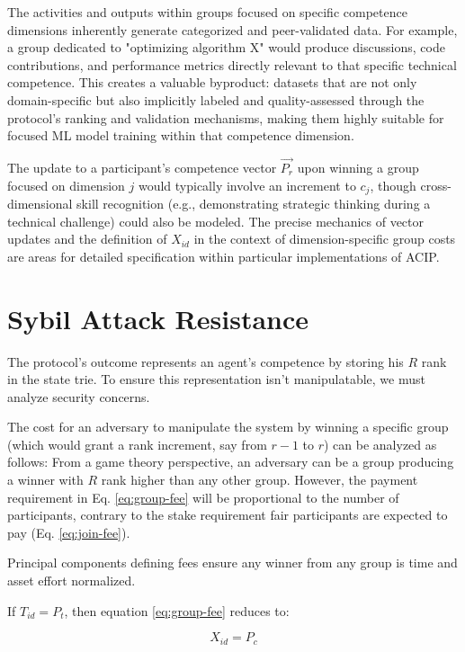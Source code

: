 \documentclass{article}
\begin{document}
\begin{CJK}{UTF8}{gbsn}
            {{The activities and outputs within groups focused on specific competence dimensions inherently generate categorized and peer-validated data. For example, a group dedicated to "optimizing algorithm X" would produce discussions, code contributions, and performance metrics directly relevant to that specific technical competence. This creates a valuable byproduct: datasets that are not only domain-specific but also implicitly labeled and quality-assessed through the protocol's ranking and validation mechanisms, making them highly suitable for focused ML model training within that competence dimension.}}

        The update to a participant's competence vector $\vec{P_r}$ upon winning a group focused on dimension $j$ would typically involve an increment to $c_j$, though cross-dimensional skill recognition (e.g., demonstrating strategic thinking during a technical challenge) could also be modeled. The precise mechanics of vector updates and the definition of $X_{id}$ in the context of dimension-specific group costs are areas for detailed specification within particular implementations of ACIP.

        \section{Sybil Attack Resistance}

        The protocol's outcome represents an agent's competence by storing his $R$ rank in the state trie. To ensure this representation isn't manipulatable, we must analyze security concerns.

        The cost for an adversary to manipulate the system by winning a specific group (which would grant a rank increment, say from $r-1$ to $r$) can be analyzed as follows:
        From a game theory perspective, an adversary can be a group producing a winner with $R$ rank higher than any other group. However, the payment requirement in Eq. \ref{eq:group-fee} will be proportional to the number of participants, contrary to the stake requirement fair participants are expected to pay (Eq. \ref{eq:join-fee}).

        Principal components defining fees ensure any winner from any group is time and asset effort normalized.

        If $T_{id} = P_t$, then equation \ref{eq:group-fee} reduces to:

        \begin{equation}
            \label{eq:join-fee-2}
            X_{id} = P_c
        \end{equation}


\end{CJK}
\end{document}
